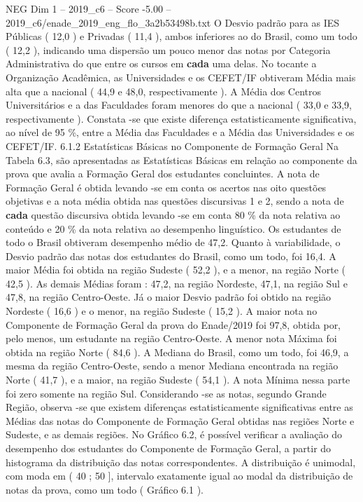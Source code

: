 \begin{textsample}{NEG Dim 1 – 2019\_c6 – Score -5.00 – 2019\_c6/enade\_2019\_eng\_flo\_3a2b53498b.txt}
O Desvio padrão para as IES Públicas ( 12,0 ) e Privadas ( 11,4 ), ambos inferiores ao do Brasil, como um todo ( 12,2 ), indicando uma dispersão um pouco menor das notas por Categoria Administrativa do que entre os cursos em \textbf{cada} uma delas.
No tocante a Organização Acadêmica, as Universidades e os CEFET/IF obtiveram Média mais alta que a nacional ( 44,9 e 48,0, respectivamente ).
A Média dos Centros Universitários e a das Faculdades foram menores do que a nacional ( 33,0 e 33,9, respectivamente ).
Constata -se que existe diferença estatisticamente significativa, ao nível de 95 \%, entre a Média das Faculdades e a Média das Universidades e os CEFET/IF. 6.1.2 Estatísticas Básicas no Componente de Formação Geral Na Tabela 6.3, são apresentadas as Estatísticas Básicas em relação ao componente da prova que avalia a Formação Geral dos estudantes concluintes.
A nota de Formação Geral é obtida levando -se em conta os acertos nas oito questões objetivas e a nota média obtida nas questões discursivas 1 e 2, sendo a nota de \textbf{cada} questão discursiva obtida levando -se em conta 80 \% da nota relativa ao conteúdo e 20 \% da nota relativa ao desempenho linguístico.
Os estudantes de todo o Brasil obtiveram desempenho médio de 47,2.
Quanto à variabilidade, o Desvio padrão das notas dos estudantes do Brasil, como um todo, foi 16,4.
A maior Média foi obtida na região Sudeste ( 52,2 ), e a menor, na região Norte ( 42,5 ).
As demais Médias foram : 47,2, na região Nordeste, 47,1, na região Sul e 47,8, na região Centro-Oeste.
Já o maior Desvio padrão foi obtido na região Nordeste ( 16,6 ) e o menor, na região Sudeste ( 15,2 ).
A maior nota no Componente de Formação Geral da prova do Enade/2019 foi 97,8, obtida por, pelo menos, um estudante na região Centro-Oeste.
A menor nota Máxima foi obtida na região Norte ( 84,6 ).
A Mediana do Brasil, como um todo, foi 46,9, a mesma da região Centro-Oeste, sendo a menor Mediana encontrada na região Norte ( 41,7 ), e a maior, na região Sudeste ( 54,1 ).
A nota Mínima nessa parte foi zero somente na região Sul.
Considerando -se as notas, segundo Grande Região, observa -se que existem diferenças estatisticamente significativas entre as Médias das notas do Componente de Formação Geral obtidas nas regiões Norte e Sudeste, e as demais regiões.
No Gráfico 6.2, é possível verificar a avaliação do desempenho dos estudantes do Componente de Formação Geral, a partir do histograma da distribuição das notas correspondentes.
A distribuição é unimodal, com moda em ( 40 ; 50 ], intervalo exatamente igual ao modal da distribuição de notas da prova, como um todo ( Gráfico 6.1 ).

\end{textsample}
